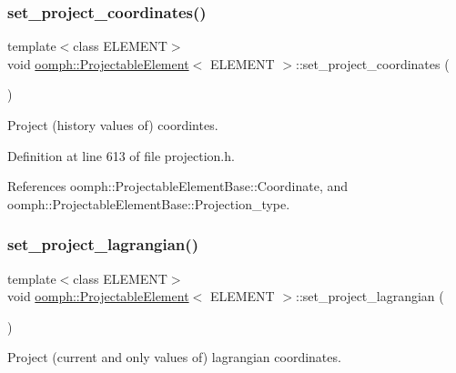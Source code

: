 \subsubsection{\texorpdfstring{set\+\_\+project\+\_\+coordinates()}{set\_project\_coordinates()}}
{\footnotesize\ttfamily template$<$class E\+L\+E\+M\+E\+NT$>$ \\
void \hyperlink{classoomph_1_1ProjectableElement}{oomph\+::\+Projectable\+Element}$<$ E\+L\+E\+M\+E\+NT $>$\+::set\+\_\+project\+\_\+coordinates (\begin{DoxyParamCaption}{ }\end{DoxyParamCaption})\hspace{0.3cm}{\ttfamily [inline]}}



Project (history values of) coordintes. 



Definition at line 613 of file projection.\+h.



References oomph\+::\+Projectable\+Element\+Base\+::\+Coordinate, and oomph\+::\+Projectable\+Element\+Base\+::\+Projection\+\_\+type.

\mbox{\label{classoomph_1_1ProjectableElement_ae1a46981a1ca1b4f9f1ef1783a168cf4}} 
\subsubsection{\texorpdfstring{set\+\_\+project\+\_\+lagrangian()}{set\_project\_lagrangian()}}
{\footnotesize\ttfamily template$<$class E\+L\+E\+M\+E\+NT$>$ \\
void \hyperlink{classoomph_1_1ProjectableElement}{oomph\+::\+Projectable\+Element}$<$ E\+L\+E\+M\+E\+NT $>$\+::set\+\_\+project\+\_\+lagrangian (\begin{DoxyParamCaption}{ }\end{DoxyParamCaption})\hspace{0.3cm}{\ttfamily [inline]}}



Project (current and only values of) lagrangian coordinates. 



